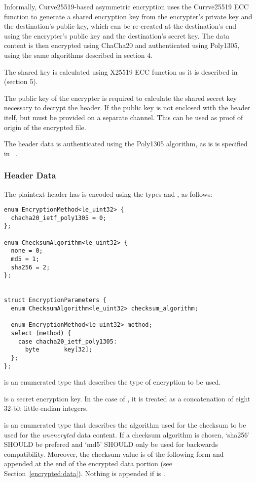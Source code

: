 Informally, Curve25519-based asymmetric encryption uses the Currve25519 ECC function to generate a shared encryption key from the encrypter's private key and the destination's public key, which can be re-created at the destination's end using the encrypter's public key and the destination's secret key. The data content is then encrypted using ChaCha20 and authenticated using Poly1305, using the same algorithms described in section 4.
%

The shared key is calculated using X25519 ECC function as it is described in ~\cite{RFC7748} (section 5).
%

The public key of the encrypter is required to calculate the shared secret key necessary to decrypt the header. 
If the public key is not enclosed with the header itelf, but must be provided on a separate channel. 
This can be used as proof of origin of the encrypted file.
%

The header data is authenticated using the Poly1305 algorithm, as is is specified in ~\cite{RFC8439}.
%

\subsubsection{Header Data}
%

The plaintext header has is encoded using the types  and , as follows:

\begin{verbatim}
enum EncryptionMethod<le_uint32> {
  chacha20_ietf_poly1305 = 0;
};

enum ChecksumAlgorithm<le_uint32> {
  none = 0;
  md5 = 1;
  sha256 = 2;
};


struct EncryptionParameters {
  enum ChecksumAlgorithm<le_uint32> checksum_algorithm;

  enum EncryptionMethod<le_uint32> method;
  select (method) {
    case chacha20_ietf_poly1305:
      byte       key[32];
  };
};
\end{verbatim}

 is an enumerated type that describes the type of encryption to be used.

 is a secret encryption key.
%
In the case of , it is treated as a concatenation of eight 32-bit little-endian integers.

 is an enumerated type that describes the algorithm used for the checksum to be used for the \emph{unencryted} data content.
%
If a checksum algorithm is chosen, `sha256' SHOULD be prefered and `md5' SHOULD only be used for backwards compatibility.
%
Moreover, the checksum value is of the following form and appended at the end of the encrypted data portion (see Section~\ref{encrypted:data}).
Nothing is appended if  is .

